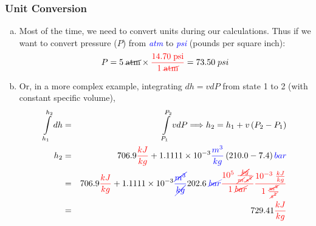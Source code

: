 \documentclass[10pt,compress]{beamer}
\newcommand{\blue}{\textcolor{blue}}
\begin{document}
\begin{frame}
 \frametitle{Unit Conversion}
  \begin{enumerate}[(a)]
   \item<1-> Most of the time, we need to convert units during our calculations. Thus if we want to convert pressure ($P$) from \blue{\it atm} to \blue{\it psi} (pounds per square inch):
      \begin{displaymath}
        P = 5\;\cancel{\text{atm}} \times \textcolor{red}{\displaystyle\frac{14.70\;\text{psi}}{1\;\cancel{\text{atm}}}} = 73.50\;psi 
      \end{displaymath}
   \item<2-> Or, in a more complex example, integrating $dh=vdP$ from state 1 to 2 (with constant specific volume),
      \begin{eqnarray}
        \int\limits_{h_{1}}^{h_{2}}dh &=& \int\limits_{P_{1}}^{P_{2}}vdP \Longrightarrow h_{2} = h_{1} + v\left(P_{2}-P_{1}\right) \nonumber \\
         h_{2} &=& 706.9\textcolor{red}{\frac{kJ}{kg}} + 1.1111\times 10^{-3}\textcolor{blue}{\frac{m^{3}}{kg}}\left(210.0-7.4\right)\textcolor{blue}{bar} \nonumber \\
              &=& 706.9\textcolor{red}{\frac{kJ}{kg}} + 1.1111\times 10^{-3}\textcolor{blue}{\frac{\cancel{m^{3}}}{\cancel{kg}}} 202.6\;\textcolor{blue}{\cancel{bar}} \textcolor{red}{\frac{10^{5}\;\frac{\cancel{kg}}{\cancel{m}.\cancel{s^{2}}}}{1\; \cancel{bar}}} \textcolor{red}{\frac{10^{-3}\; \frac{kJ}{kg}}{1\;\frac{\cancel{m^{2}}}{\cancel{s^{2}}}}} \nonumber \\
              &=& 729.41\textcolor{red}{\frac{kJ}{kg}} \nonumber 
      \end{eqnarray} 
  \end{enumerate}
\end{frame}
\end{document}
